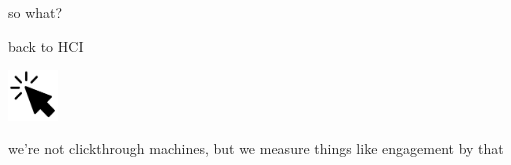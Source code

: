 \documentclass[presentation]{subfiles}
\begin{document}
\begin{frame}[standout]
so what?
\end{frame}

\begin{frame}{back to HCI}

\includegraphics[width=0.1\textwidth]{figures/click_alpha.png}


we're not clickthrough machines, but we measure things like \alert<1>{engagement} by that




\end{frame}
\end{document}
